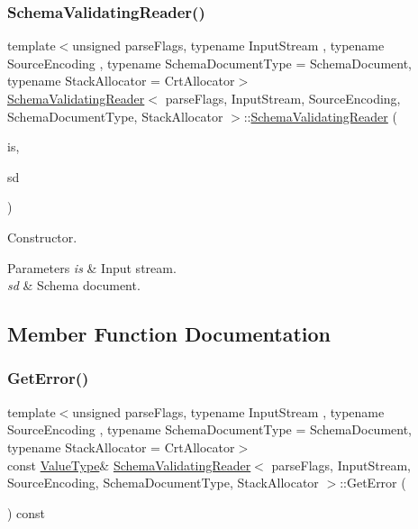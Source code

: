 \subsubsection{\texorpdfstring{Schema\+Validating\+Reader()}{SchemaValidatingReader()}}
{\footnotesize\ttfamily template$<$unsigned parse\+Flags, typename Input\+Stream , typename Source\+Encoding , typename Schema\+Document\+Type  = Schema\+Document, typename Stack\+Allocator  = Crt\+Allocator$>$ \\
\hyperlink{classSchemaValidatingReader}{Schema\+Validating\+Reader}$<$ parse\+Flags, Input\+Stream, Source\+Encoding, Schema\+Document\+Type, Stack\+Allocator $>$\+::\hyperlink{classSchemaValidatingReader}{Schema\+Validating\+Reader} (\begin{DoxyParamCaption}\item[{Input\+Stream \&}]{is,  }\item[{const Schema\+Document\+Type \&}]{sd }\end{DoxyParamCaption})\hspace{0.3cm}{\ttfamily [inline]}}



Constructor. 


\begin{DoxyParams}{Parameters}
{\em is} & Input stream. \\
\hline
{\em sd} & Schema document. \\
\hline
\end{DoxyParams}


\subsection{Member Function Documentation}
\mbox{\label{classSchemaValidatingReader_a7a54d5f2378f85f5ca23440f8f1d214e}} 
\subsubsection{\texorpdfstring{Get\+Error()}{GetError()}}
{\footnotesize\ttfamily template$<$unsigned parse\+Flags, typename Input\+Stream , typename Source\+Encoding , typename Schema\+Document\+Type  = Schema\+Document, typename Stack\+Allocator  = Crt\+Allocator$>$ \\
const \hyperlink{classSchemaValidatingReader_af08b51fcef602c68d95769c35ae606be}{Value\+Type}\& \hyperlink{classSchemaValidatingReader}{Schema\+Validating\+Reader}$<$ parse\+Flags, Input\+Stream, Source\+Encoding, Schema\+Document\+Type, Stack\+Allocator $>$\+::Get\+Error (\begin{DoxyParamCaption}{ }\end{DoxyParamCaption}) const\hspace{0.3cm}{\ttfamily [inline]}}

